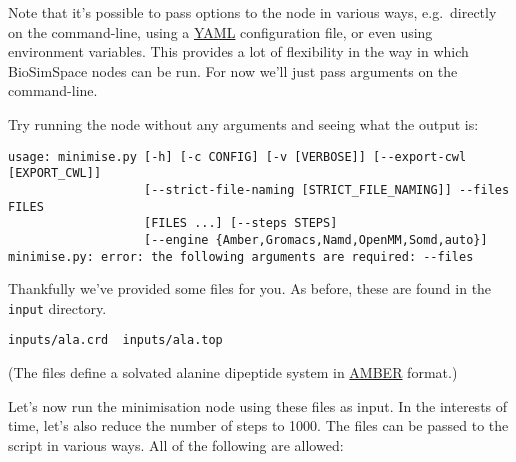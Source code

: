 Note that it's possible to pass options to the node in various ways,
e.g.~directly on the command-line, using a
\href{https://en.wikipedia.org/wiki/YAML}{YAML} configuration file, or
even using environment variables. This provides a lot of flexibility in
the way in which BioSimSpace nodes can be run. For now we'll just pass
arguments on the command-line.

Try running the node without any arguments and seeing what the output
is:

\begin{Shaded}
\begin{Highlighting}[]
\OperatorTok{/}
\end{Highlighting}
\end{Shaded}

\begin{verbatim}
usage: minimise.py [-h] [-c CONFIG] [-v [VERBOSE]] [--export-cwl [EXPORT_CWL]]
                   [--strict-file-naming [STRICT_FILE_NAMING]] --files FILES
                   [FILES ...] [--steps STEPS]
                   [--engine {Amber,Gromacs,Namd,OpenMM,Somd,auto}]
minimise.py: error: the following arguments are required: --files
\end{verbatim}

Thankfully we've provided some files for you. As before, these are found
in the \texttt{input} directory.

\begin{Shaded}
\begin{Highlighting}[]
\OperatorTok{/}\OperatorTok{*}
\end{Highlighting}
\end{Shaded}

\begin{verbatim}
inputs/ala.crd  inputs/ala.top
\end{verbatim}

(The files define a solvated alanine dipeptide system in
\href{http://ambermd.org}{AMBER} format.)

Let's now run the minimisation node using these files as input. In the
interests of time, let's also reduce the number of steps to 1000. The
files can be passed to the script in various ways. All of the following
are allowed:

\begin{Shaded}
\begin{Highlighting}[]
\end{Highlighting}
\end{Shaded}

